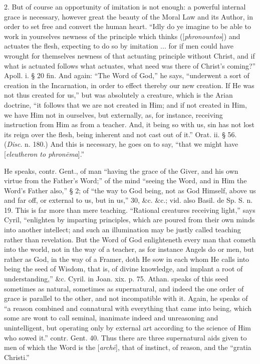 2. But
of course an opportunity of imitation is not enough: a powerful
internal grace is necessary, however great the beauty of the Moral Law
and its Author, in order to set free and convert the human heart. ``Idly
do ye imagine to be able to work in yourselves newness of the
principle which thinks ([\emph{phronountos}]) and actuates
the flesh, expecting to do so by imitation ... for if men could have
wrought for themselves newness of that actuating principle without
Christ, and if what is actuated follows what actuates, what need was
there of Christ's coming?'' Apoll. i. § 20 fin. And again: ``The Word
of God,'' he says, ``underwent a sort of creation in the Incarnation, in
order to effect thereby our new creation. If He was not thus created
for us,'' but was absolutely a creature, which is the Arian doctrine, ``it
follows that we are not created in Him; and if not created in Him, we
have Him not in ourselves, but externally, as, for instance, receiving
instruction from Him as from a teacher. And, it being so with us, sin
has not lost its reign over the flesh, being inherent and not cast out
of it.'' Orat. ii. § 56. (\emph{Disc}. n. 180.) And this is necessary, he goes on to say, ``that we
might have [\emph{eleutheron to phron\={e}ma}].''

He speaks, contr. Gent., of man ``having the grace
of the Giver, and his own virtue from the Father's Word;'' of the mind ``seeing
the Word, and in Him the Word's Father also,'' § 2; of ``the way to God
being, not as God Himself, above us and far off, or external to us,
but in us,'' 30, \&c. \&c.; vid. also Basil. de Sp. S. n. 19.
This is far more than mere teaching. ``Rational creatures receiving
light,'' says Cyril, ``enlighten by imparting principles, which are
poured from their own minds into another intellect; and such an
illumination may be justly called teaching rather than revelation. But
the Word of God enlighteneth every man that cometh into the world, not
in the way of a teacher, as for instance Angels do or men, but
rather as God, in the way of a Framer, doth He sow in each whom He
calls into being the seed of Wisdom, that is, of divine knowledge, and
implant a root of understanding,'' \&c. Cyril. in Joan. xix. p. 75.
Athan. speaks of this seed sometimes as natural, sometimes as
supernatural, and indeed the one order of grace is parallel to the
other, and not incompatible with it. Again, he speaks of ``a reason
combined and connatural with everything that came into being, which
some are wont to call seminal, inanimate indeed and unreasoning and
unintelligent, but operating only by external art according to the
science of Him who sowed it.'' contr. Gent. 40. Thus there are three
supernatural aids given to men of which the Word is the
[\emph{arch\={e}}], that of instinct, of reason, and the ``gratia Christi.''

